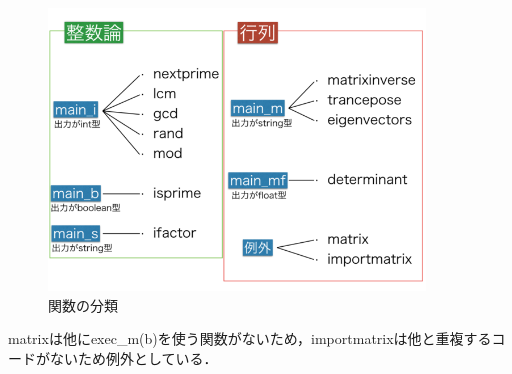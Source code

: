 \newpage

\begin{figure}[htbp]\begin{center}
\includegraphics[width=10cm,bb= 0 0 737 553]{../figs/./mapleruby_eringi.007.png}
\caption{関数の分類}
\label{default}\end{center}\end{figure}
matrixは他にexec\_m(b)を使う関数がないため，importmatrixは他と重複するコードがないため例外としている．

